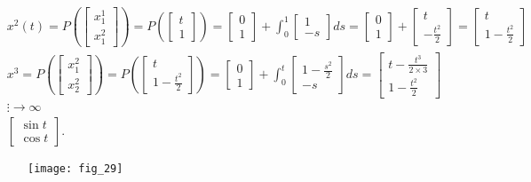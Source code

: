 \documentclass[../main.tex]{subfiles}
\begin{document}
\begin{przyklad}
\begin{align*}
        &x^2(t) = P\left(\begin{bmatrix} x_1^1\\x_1^2 \end{bmatrix} \right) = P\left( \begin{bmatrix} t\\1 \end{bmatrix}  \right)  = \begin{bmatrix} 0\\1 \end{bmatrix} + \int_0^1 \begin{bmatrix} 1\\-s \end{bmatrix} ds = \begin{bmatrix} 0\\1 \end{bmatrix} +\begin{bmatrix} t\\-\frac{t^2}{2} \end{bmatrix} = \begin{bmatrix} t\\1-\frac{t^2}{2} \end{bmatrix}\\
        &x^3 = P\left( \begin{bmatrix} x_1^2\\x_2^2 \end{bmatrix}  \right) = P\left( \begin{bmatrix} t\\1-\frac{t^2}{2} \end{bmatrix}  \right) = \begin{bmatrix} 0\\1 \end{bmatrix} + \int_0^t \begin{bmatrix} 1-\frac{s^2}{2}\\-s \end{bmatrix} ds = \begin{bmatrix} t-\frac{t^3}{2\times 3}\\1-\frac{t^2}{2} \end{bmatrix}\\
        &\vdots \to \infty\\
        &\begin{bmatrix} \sin{t}\\ \cos{t} \end{bmatrix}
    .\end{align*}
    \begin{figure}[b]
        \centering
        \texttt{[image: fig\_29]}
        \caption{}
        \label{fig:fig_29}
    \end{figure}
\end{przyklad}
\end{document}
